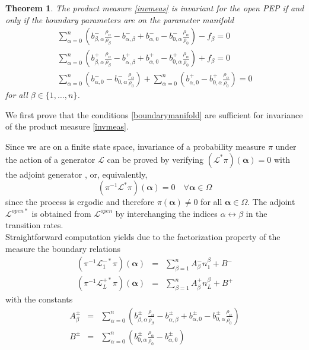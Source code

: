 \documentclass[12pt]{article}
\newcommand{\ba}{\begin{array}}
\newcommand{\ea}{\end{array}}
\newcommand{\balpha}{\boldsymbol{\alpha}}
\newtheorem{theo}{Theorem}[section]
\newcommand{\Proof}{\noindent {\it Proof: }}
\begin{document}
\begin{theo}
The product measure \eqref{invmeas} is invariant for the open PEP 
if and only if the boundary parameters are on the parameter
manifold 
\begin{equation}
\ba{l}
\displaystyle \sum_{\alpha=0}^n 
\left(b_{\beta,\alpha}^{-} \frac{\rho_\alpha}{\rho_\beta}  - b_{\alpha,\beta}^{-} 
+ b_{\alpha,0}^{-} 
- b_{0,\alpha}^{-} \frac{\rho_\alpha}{\rho_0}
\right)  - f_\beta = 0 \\[6mm]
\displaystyle \sum_{\alpha=0}^n 
\left(b_{\beta,\alpha}^{+} \frac{\rho_\alpha}{\rho_\beta}  - b_{\alpha,\beta}^{+} 
+ b_{\alpha,0}^{+} 
- b_{0,\alpha}^{+} \frac{\rho_\alpha}{\rho_0}
\right)  + f_\beta = 0 \\[6mm]
\displaystyle \sum_{\alpha=0}^n \left(b_{\alpha,0}^{-}  - 
b_{0,\alpha}^{-} \frac{\rho_\alpha}{\rho_0} \right)  
+ \sum_{\alpha=0}^n \left(b_{\alpha,0}^{+} - b_{0,\alpha}^{+} 
\frac{\rho_\alpha}{\rho_0}  \right)  = 0
\ea
\label{boundarymanifold}
\end{equation}
for all $\beta\in\{1,\dots,n\}$.
\end{theo}

\Proof 
We first prove that the conditions \eqref{boundarymanifold} are sufficient
for invariance of the product measure \eqref{invmeas}.

Since we are on a finite state space, invariance of a probability measure
$\pi$ under the action of a generator $\mathcal{L}$ can be proved by 
verifying  $(\mathcal{L}^\ast \pi) (\balpha) = 0$ with the adjoint generator \cite{Ligg10}, or, equivalently, 
\begin{equation}
(\pi^{-1} \mathcal{L}^\ast \pi) (\balpha) = 0 \quad \forall \balpha \in \Omega
\label{invprop}
\end{equation}
since the process is ergodic and therefore $\pi(\balpha) \neq 0$
for all $\balpha\in\Omega$.
The adjoint $\mathcal{L}^{open\ast}$ is obtained from
$\mathcal{L}^{open}$ by interchanging the indices $\alpha\leftrightarrow\beta$ in the transition rates. \\

Straightforward
computation yields due to the factorization
property of the measure the boundary relations
\begin{eqnarray}
(\pi^{-1} \mathcal{L}^{-\ast}_{1} \pi) (\balpha) 
& = & \sum_{\beta=1}^n A^{-}_\beta n^{\beta}_{1} + B^{-} \\
(\pi^{-1} \mathcal{L}^{+\ast}_{L} \pi) (\balpha) 
& = & \sum_{\beta=1}^n A^{+}_\beta n^{\beta}_{L} + B^{+}
\end{eqnarray}
with the constants
\begin{eqnarray}
A_\beta^{\pm} & = & \sum_{\alpha=0}^n 
\left(b_{\beta,\alpha}^{\pm} \frac{\rho_\alpha}{\rho_\beta}  - b_{\alpha,\beta}^{\pm} 
+ b_{\alpha,0}^{\pm} 
- b_{0,\alpha}^{\pm} \frac{\rho_\alpha}{\rho_0}
\right) \\
B^{\pm} & = & \sum_{\alpha=0}^n \left(b_{0,\alpha}^{\pm} 
\frac{\rho_\alpha}{\rho_0} - b_{\alpha,0}^{\pm} \right) 
\end{eqnarray}
\end{document}
